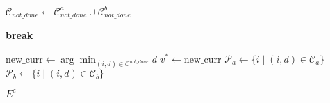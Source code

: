 \documentclass{article}
\begin{document}
\begin{algorithm}
\begin{algorithmic}[1]
        
        \State $\mathcal{C}_{not\_done} \gets \mathcal{C}^a_{not\_done} \cup \mathcal{C}^b_{not\_done}$
        
            \State \textbf{break}
        \EndIf
        
        \State $\text{new\_curr} \gets \arg\min_{(i, d) \in \mathcal{C}^{not\_done}} d$
        \State $v^* \gets \text{new\_curr}$
        \State $\mathcal{P}_a \gets \{i \mid (i, d) \in \mathcal{C}_a\}$
        \State $\mathcal{P}_b \gets \{i \mid (i, d) \in \mathcal{C}_b\}$
    \EndWhile
\EndWhile

\State \Return $E^c$


\end{algorithmic}
\end{algorithm}







\end{document}
